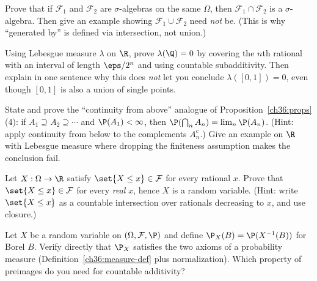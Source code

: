 \begin{exercise}
\label{ch36:ex-intersection}
Prove that if $\mathcal{F}_1$ and $\mathcal{F}_2$ are $\sigma$-algebras on the same
$\Omega$, then $\mathcal{F}_1 \cap \mathcal{F}_2$ is a $\sigma$-algebra. Then give
an example showing $\mathcal{F}_1 \cup \mathcal{F}_2$ need \emph{not} be. (This is
why ``generated by'' is defined via intersection, not union.)
\end{exercise}

\begin{exercise}
\label{ch36:ex-null}
Using Lebesgue measure $\lambda$ on $\R$, prove $\lambda(\Q) = 0$ by covering the
$n$th rational with an interval of length $\eps / 2^n$ and using countable
subadditivity. Then explain in one sentence why this does \emph{not} let you
conclude $\lambda([0,1]) = 0$, even though $[0,1]$ is also a union of single
points.
\end{exercise}

\begin{exercise}
\label{ch36:ex-cont-above}
State and prove the ``continuity from above'' analogue of
Proposition~\ref{ch36:props}(4): if $A_1 \supseteq A_2 \supseteq \cdots$ and
$\P(A_1) < \infty$, then $\P\!\left(\bigcap_n A_n\right) = \lim_n \P(A_n)$.
(Hint: apply continuity from below to the complements $A_n^c$.) Give an example on
$\R$ with Lebesgue measure where dropping the finiteness assumption makes the
conclusion fail.
\end{exercise}

\begin{exercise}
\label{ch36:ex-measurable}
Let $X : \Omega \to \R$ satisfy $\set{X \le x} \in \mathcal{F}$ for every rational
$x$. Prove that $\set{X \le x} \in \mathcal{F}$ for every \emph{real} $x$, hence
$X$ is a random variable. (Hint: write $\set{X \le x}$ as a countable
intersection over rationals decreasing to $x$, and use closure.)
\end{exercise}

\begin{exercise}
\label{ch36:ex-pushforward}
Let $X$ be a random variable on $(\Omega, \mathcal{F}, \P)$ and define
$\P_X(B) = \P(X^{-1}(B))$ for Borel $B$. Verify directly that $\P_X$ satisfies the
two axioms of a probability measure (Definition~\ref{ch36:measure-def} plus
normalization). Which property of preimages do you need for countable additivity?
\end{exercise}

